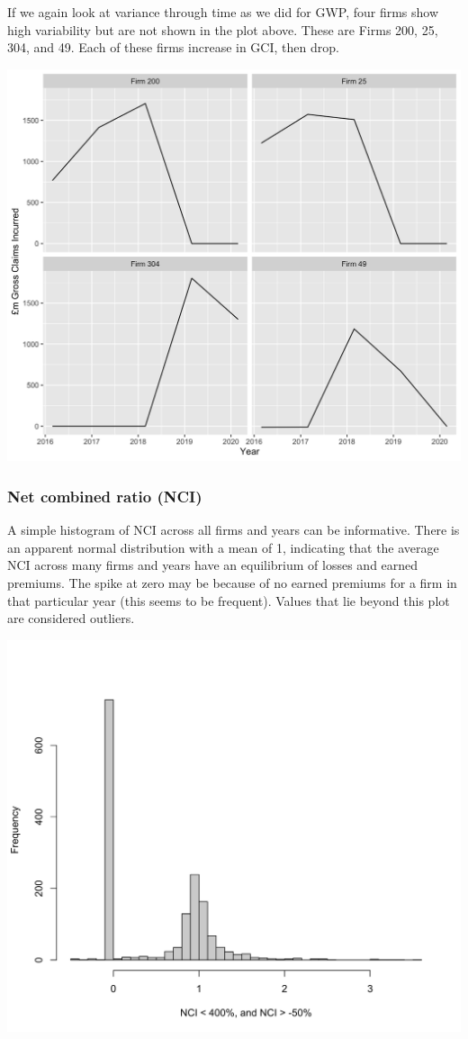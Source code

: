 \documentclass[
]{article}
\begin{document}
If we again look at variance through time as we did for GWP, four firms
show high variability but are not shown in the plot above. These are
Firms 200, 25, 304, and 49. Each of these firms increase in GCI, then
drop.

\includegraphics[width=1\linewidth]{../figs/variable_gci_plot}

\hypertarget{net-combined-ratio-nci}{%
\subsubsection{Net combined ratio (NCI)}\label{net-combined-ratio-nci}}

A simple histogram of NCI across all firms and years can be informative.
There is an apparent normal distribution with a mean of 1, indicating
that the average NCI across many firms and years have an equilibrium of
losses and earned premiums. The spike at zero may be because of no
earned premiums for a firm in that particular year (this seems to be
frequent). Values that lie beyond this plot are considered outliers.

\includegraphics[width=1\linewidth]{../figs/hist_nci}
\end{document}
